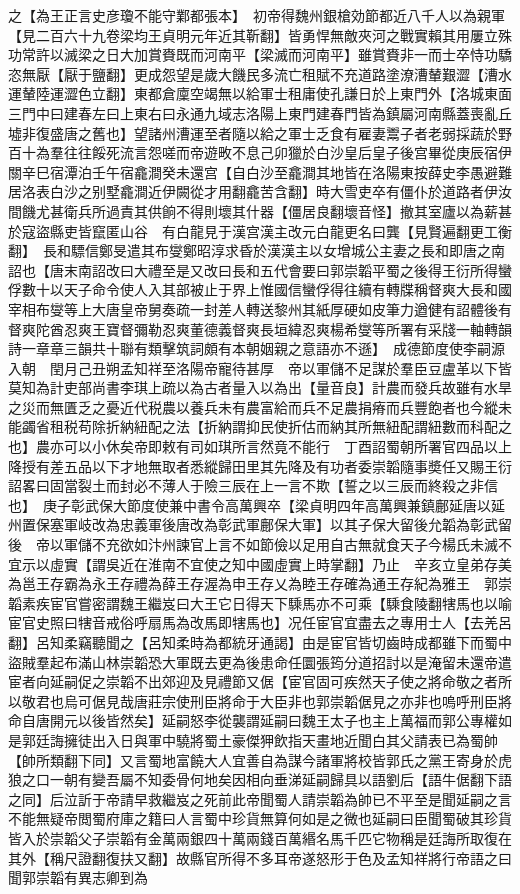 之【為王正言史彦瓊不能守鄴都張本】　初帝得魏州銀槍効節都近八千人以為親軍【見二百六十九卷梁均王貞明元年近其靳翻】皆勇悍無敵夾河之戰實賴其用屢立殊功常許以滅梁之日大加賞賚既而河南平【梁滅而河南平】雖賞賚非一而士卒恃功驕恣無厭【厭于鹽翻】更成怨望是歲大饑民多流亡租賦不充道路塗潦漕輦艱澀【漕水運輦陸運澀色立翻】東都倉廩空竭無以給軍士租庸使孔謙日於上東門外【洛城東面三門中曰建春左曰上東右曰永通九域志洛陽上東門建春門皆為鎮屬河南縣蓋喪亂丘墟非復盛唐之舊也】望諸州漕運至者隨以給之軍士乏食有雇妻鬻子者老弱採蔬於野百十為羣往往餒死流言怨嗟而帝遊畋不息己卯獵於白沙皇后皇子後宫畢從庚辰宿伊關辛巳宿潭泊壬午宿龕澗癸未還宫【自白沙至龕澗其地皆在洛陽東按薛史李愚避難居洛表白沙之别墅龕澗近伊闕從才用翻龕苦含翻】時大雪吏卒有僵仆於道路者伊汝間饑尤甚衛兵所過責其供餉不得則壞其什器【僵居良翻壞音怪】撤其室廬以為薪甚於寇盜縣吏皆竄匿山谷　有白龍見于漢宫漢主改元白龍更名曰龔【見賢遍翻更工衡翻】　長和驃信鄭旻遣其布燮鄭昭淳求昏於漢漢主以女增城公主妻之長和即唐之南詔也【唐末南詔改曰大禮至是又改曰長和五代會要曰郭崇韜平蜀之後得王衍所得蠻俘數十以天子命令使人入其部被止于界上惟國信蠻俘得往續有轉牒稱督爽大長和國宰相布燮等上大唐皇帝舅奏疏一封差人轉送黎州其紙厚硬如皮筆力遒健有詔體後有督爽陀酋忍爽王寶督彌勒忍爽董德義督爽長垣緯忍爽楊希燮等所署有采牋一軸轉韻詩一章章三韻共十聯有類擊筑詞頗有本朝姻親之意語亦不遜】　成德節度使李嗣源入朝　閏月己丑朔孟知祥至洛陽帝寵待甚厚　帝以軍儲不足謀於羣臣豆盧革以下皆莫知為計吏部尚書李琪上疏以為古者量入以為出【量音良】計農而發兵故雖有水旱之災而無匱乏之憂近代税農以養兵未有農富給而兵不足農捐瘠而兵豐飽者也今縱未能蠲省租税苟除折納紐配之法【折納謂抑民使折估而納其所無紐配謂紐數而科配之也】農亦可以小休矣帝即敕有司如琪所言然竟不能行　丁酉詔蜀朝所署官四品以上降授有差五品以下才地無取者悉縱歸田里其先降及有功者委崇韜隨事奬任又賜王衍詔畧曰固當裂土而封必不薄人于險三辰在上一言不欺【誓之以三辰而終殺之非信也】　庚子彰武保大節度使兼中書令高萬興卒【梁貞明四年高萬興兼鎮鄜延唐以延州置保塞軍岐改為忠義軍後唐改為彰武軍鄜保大軍】以其子保大留後允韜為彰武留後　帝以軍儲不充欲如汴州諫官上言不如節儉以足用自古無就食天子今楊氏未滅不宜示以虛實【謂吳近在淮南不宜使之知中國虛實上時掌翻】乃止　辛亥立皇弟存美為邕王存霸為永王存禮為薛王存渥為申王存乂為睦王存確為通王存紀為雅王　郭崇韜素疾宦官嘗密謂魏王繼岌曰大王它日得天下騬馬亦不可乘【騬食陵翻犗馬也以喻宦官史照曰犗音戒俗呼扇馬為改馬即犗馬也】况任宦官宜盡去之專用士人【去羌呂翻】呂知柔竊聽聞之【呂知柔時為都統牙通謁】由是宦官皆切齒時成都雖下而蜀中盜賊羣起布滿山林崇韜恐大軍既去更為後患命任圜張筠分道招討以是淹留未還帝遣宦者向延嗣促之崇韜不出郊迎及見禮節又倨【宦官固可疾然天子使之將命敬之者所以敬君也烏可倨見哉唐莊宗使刑臣將命于大臣非也郭崇韜倨見之亦非也嗚呼刑臣將命自唐開元以後皆然矣】延嗣怒李從襲謂延嗣曰魏王太子也主上萬福而郭公專權如是郭廷誨擁徒出入日與軍中驍將蜀土豪傑狎飲指天畫地近聞白其父請表已為蜀帥【帥所類翻下同】又言蜀地富饒大人宜善自為謀今諸軍將校皆郭氏之黨王寄身於虎狼之口一朝有變吾屬不知委骨何地矣因相向垂涕延嗣歸具以語劉后【語牛倨翻下語之同】后泣訢于帝請早救繼岌之死前此帝聞蜀人請崇韜為帥已不平至是聞延嗣之言不能無疑帝閲蜀府庫之籍曰人言蜀中珍貨無算何如是之微也延嗣曰臣聞蜀破其珍貨皆入於崇韜父子崇韜有金萬兩銀四十萬兩錢百萬緡名馬千匹它物稱是廷誨所取復在其外【稱尺證翻復扶又翻】故縣官所得不多耳帝遂怒形于色及孟知祥將行帝語之曰聞郭崇韜有異志卿到為